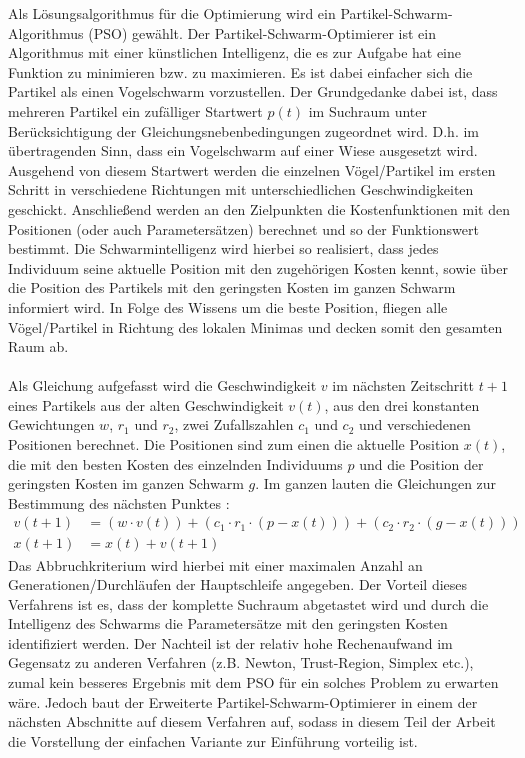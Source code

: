 Als Lösungsalgorithmus für die Optimierung wird ein Partikel-Schwarm-Algorithmus (PSO) gewählt. Der Partikel-Schwarm-Optimierer ist ein Algorithmus mit einer künstlichen Intelligenz, die es zur Aufgabe hat eine Funktion zu minimieren bzw. zu maximieren. Es ist dabei einfacher sich die Partikel als einen Vogelschwarm vorzustellen. Der Grundgedanke dabei ist, dass mehreren Partikel ein zufälliger Startwert $p\left( t \right)$ im Suchraum unter Berücksichtigung der Gleichungsnebenbedingungen zugeordnet wird. D.h. im übertragenden Sinn, dass ein Vogelschwarm auf einer Wiese ausgesetzt wird. Ausgehend von diesem Startwert werden die einzelnen Vögel/Partikel im ersten Schritt in verschiedene Richtungen mit unterschiedlichen Geschwindigkeiten geschickt. Anschließend werden an den Zielpunkten die Kostenfunktionen mit den Positionen (oder auch Parametersätzen) berechnet und so der Funktionswert bestimmt. Die Schwarmintelligenz wird hierbei so realisiert, dass jedes Individuum seine aktuelle Position mit den zugehörigen Kosten kennt, sowie über die Position des Partikels mit den geringsten Kosten im ganzen Schwarm informiert wird. In Folge des Wissens um die beste Position, fliegen alle Vögel/Partikel in Richtung des lokalen Minimas und decken somit den gesamten Raum ab. \\ \\
Als Gleichung aufgefasst wird die Geschwindigkeit $v$ im nächsten Zeitschritt $t+1$ eines Partikels aus der alten Geschwindigkeit $v\left( t \right)$, aus den drei konstanten Gewichtungen $w$, $r_1$ und $r_2$, zwei Zufallszahlen $c_1$ und $c_2$ und verschiedenen Positionen berechnet. Die Positionen sind zum einen die aktuelle Position $x\left( t \right)$, die mit den besten Kosten des einzelnden Individuums $p$ und die Position der geringsten Kosten im ganzen Schwarm $g$. Im ganzen lauten die Gleichungen zur Bestimmung des nächsten Punktes \cite{PSO}:
\begin{align}
v\left( t+1 \right)&=\left( w\cdot v\left( t \right) \right) + \left( c_1\cdot r_1\cdot \left( p - x\left( t \right) \right) \right) + \left( c_2\cdot r_2\cdot \left( g - x\left( t \right) \right) \right) \\
x\left( t+1 \right)&=x\left( t \right) + v\left( t+1 \right)
\end{align}
Das Abbruchkriterium wird hierbei mit einer maximalen Anzahl an Generationen/Durchläufen der Hauptschleife angegeben. Der Vorteil dieses Verfahrens ist es, dass der komplette Suchraum abgetastet wird und durch die Intelligenz des Schwarms die Parametersätze mit den geringsten Kosten identifiziert werden. Der Nachteil ist der relativ hohe Rechenaufwand im Gegensatz zu anderen Verfahren (z.B. Newton, Trust-Region, Simplex etc.), zumal kein besseres Ergebnis mit dem PSO für ein solches Problem zu erwarten wäre. Jedoch baut der Erweiterte Partikel-Schwarm-Optimierer in einem der nächsten Abschnitte auf diesem Verfahren auf, sodass in diesem Teil der Arbeit die Vorstellung der einfachen Variante zur Einführung vorteilig ist.\\ \\
